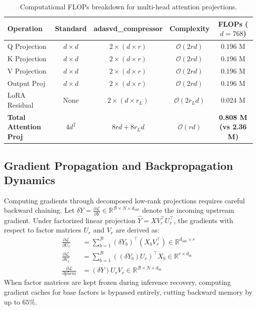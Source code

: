 \documentclass{article}
\begin{document}
\begin{table}[H]
\centering
\small
\begin{tabular}{lcccc}
\toprule
\textbf{Operation} & \textbf{Standard} & \textbf{adasvd\_compressor} & \textbf{Complexity} & \textbf{FLOPs ($d=768$)} \\
\midrule
Q Projection & $d \times d$ & $2 \times (d \times r)$ & $\mathcal{O}(2rd)$ & $0.196$ M \\
K Projection & $d \times d$ & $2 \times (d \times r)$ & $\mathcal{O}(2rd)$ & $0.196$ M \\
V Projection & $d \times d$ & $2 \times (d \times r)$ & $\mathcal{O}(2rd)$ & $0.196$ M \\
Output Proj & $d \times d$ & $2 \times (d \times r)$ & $\mathcal{O}(2rd)$ & $0.196$ M \\
LoRA Residual & None & $2 \times (d \times r_L)$ & $\mathcal{O}(2r_L d)$ & $0.024$ M \\
\midrule
\textbf{Total Attention Proj} & $4 d^2$ & $8rd + 8r_L d$ & $\mathcal{O}(rd)$ & \textbf{0.808 M (vs 2.36 M)} \\
\bottomrule
\end{tabular}
\caption{Computational FLOPs breakdown for multi-head attention projections.}
\end{table}

\subsection{Gradient Propagation and Backpropagation Dynamics}
Computing gradients through decomposed low-rank projections requires careful backward chaining. Let $\delta Y = \frac{\partial \mathcal{L}}{\partial Y} \in \mathbb{R}^{\mathcal{B} \times N \times d_{\text{out}}}$ denote the incoming upstream gradient. Under factorized linear projection $\hat{Y} = X V_r^\top U_r^\top$, the gradients with respect to factor matrices $U_r$ and $V_r$ are derived as:
\begin{align}
\frac{\partial \mathcal{L}}{\partial U_r} &= \sum_{b=1}^{\mathcal{B}} (\delta Y_b)^\top (X_b V_r^\top) \in \mathbb{R}^{d_{\text{out}} \times r} \\
\frac{\partial \mathcal{L}}{\partial V_r} &= \sum_{b=1}^{\mathcal{B}} ((\delta Y_b) U_r)^\top X_b \in \mathbb{R}^{r \times d_{\text{in}}} \\
\frac{\partial \mathcal{L}}{\partial p{5cm}} &= (\delta Y) U_r V_r \in \mathbb{R}^{\mathcal{B} \times N \times d_{\text{in}}}
\end{align}
When factor matrices are kept frozen during inference recovery, computing gradient caches for base factors is bypassed entirely, cutting backward memory by up to $65\%$.
\end{document}
